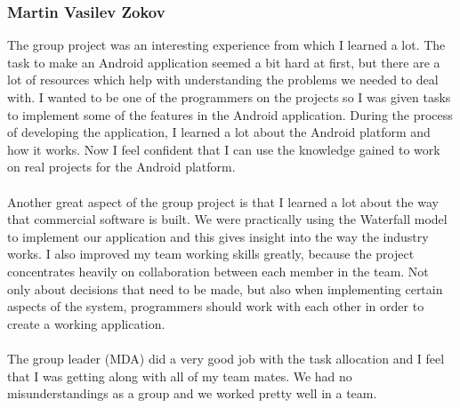 \documentclass[12pt]{article}
\begin{document}
\subsubsection{Martin Vasilev Zokov}
The group project was an interesting experience from which I learned a lot. The task to make an Android application seemed a bit hard at first, but there are a lot of resources which help with understanding the problems we needed to deal with. I wanted to be one of the programmers on the projects so I was given tasks to implement some of the features in the Android application. During the process of developing the application, I learned a lot about the Android platform and how it works. Now I feel confident that I can use the knowledge gained to work on real projects for the Android platform.
~\\\\ 
Another great aspect of the group project is that I learned a lot about the way that commercial software is built. We were practically using the Waterfall model to implement our application and this gives insight into the way the industry works. I also improved my team working skills greatly, because the project concentrates heavily on collaboration between each member in the team. Not only about decisions that need to be made, but also when implementing certain aspects of the system, programmers should work with each other in order to create a working application.
~\\\\ 
The group leader (MDA) did a very good job with the task allocation and I feel that I was getting along with all of my team mates. We had no misunderstandings as a group and we worked pretty well in a team.
\end{document}
